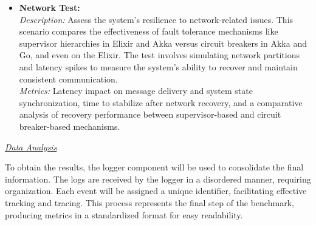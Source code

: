 \begin{itemize}
    \item \textbf{Network Test:} \\
    \textit{Description:} Assess the system's resilience to network-related issues. This scenario compares the effectiveness of fault tolerance mechanisms like supervisor hierarchies in Elixir and Akka versus circuit breakers in Akka and Go, and even on the Elixir. The test involves simulating network partitions and latency spikes to measure the system's ability to recover and maintain consistent communication. \\
    \textit{Metrics:} Latency impact on message delivery and system state synchronization, time to stabilize after network recovery, and a comparative analysis of recovery performance between supervisor-based and circuit breaker-based mechanisms.
\end{itemize}

\textit{\underline{Data Analysis}}

To obtain the results, the logger component will be used to consolidate the final information. The logs are received by the logger in a disordered manner, requiring organization. Each event will be assigned a unique identifier, facilitating effective tracking and tracing. This process represents the final step of the benchmark, producing metrics in a standardized format for easy readability.
